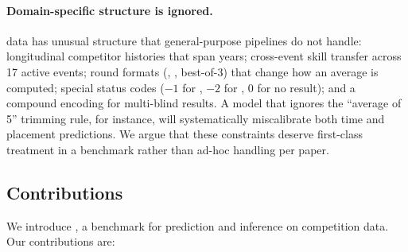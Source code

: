 \paragraph{Domain-specific structure is ignored.}
\wca{} data has unusual structure that general-purpose pipelines do not
handle: longitudinal competitor histories that span years; cross-event skill
transfer across 17 active events; round formats (, ,
best-of-3) that change how an average is computed; special status codes
($-1$ for \DNF{}, $-2$ for \DNS{}, $0$ for no result); and a compound encoding
for multi-blind results. A model that ignores the ``average of 5'' trimming
rule, for instance, will systematically miscalibrate both time and placement
predictions. We argue that these constraints deserve first-class treatment in
a benchmark rather than ad-hoc handling per paper.

\subsection{Contributions}
\label{sec:contributions}

We introduce \wcabench, a benchmark for prediction and inference on \wca{}
competition data. Our contributions are:

